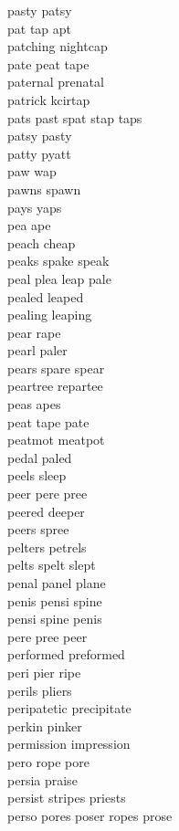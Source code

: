 pasty patsy\\
pat tap apt\\
patching nightcap\\
pate peat tape\\
paternal prenatal\\
patrick kcirtap\\
pats past spat stap taps\\
patsy pasty\\
patty pyatt\\
paw wap\\
pawns spawn\\
pays yaps\\
pea ape\\
peach cheap\\
peaks spake speak\\
peal plea leap pale\\
pealed leaped\\
pealing leaping\\
pear rape\\
pearl paler\\
pears spare spear\\
peartree repartee\\
peas apes\\
peat tape pate\\
peatmot meatpot\\
pedal paled\\
peels sleep\\
peer pere pree\\
peered deeper\\
peers spree\\
pelters petrels\\
pelts spelt slept\\
penal panel plane\\
penis pensi spine\\
pensi spine penis\\
pere pree peer\\
performed preformed\\
peri pier ripe\\
perils pliers\\
peripatetic precipitate\\
perkin pinker\\
permission impression\\
pero rope pore\\
persia praise\\
persist stripes priests\\
perso pores poser ropes prose\\
